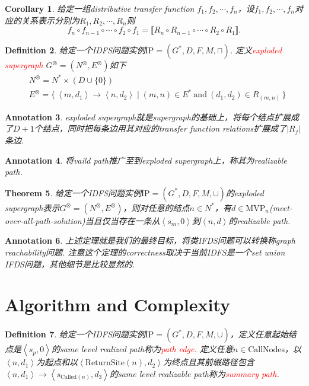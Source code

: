 \documentclass{article}
\newtheorem{theorem}{Theorem}[section]
\newtheorem{corollary}[theorem]{Corollary}
\newtheorem{definition}[theorem]{Definition}
\newtheorem{annotation}[theorem]{Annotation}
\newcommand\Set[2]{\{\,#1\mid#2\,\}} %
\newcommand{\redt}[1]{\textcolor{red}{#1}}
\begin{document}
\begin{corollary}
\rm 给定一组distributive transfer function $f_1,f_2,\cdots,f_n$，设$f_1,f_2,\cdots,f_n$对应的关系表示分别为$R_1,R_2,\cdots,R_n$则
$$
f_n \circ f_{n-1} \circ \cdots \circ f_2 \circ f_1 = \llbracket R_n \circ R_{n-1} \circ \cdots \circ R_2 \circ R_1 \rrbracket.
$$
\end{corollary}

\begin{definition}
\rm 给定一个IDFS问题实例$\text{IP}=(G^*,D,F,M,\sqcap)$. 定义\redt{exploded supergraph} $G^\otimes = (N^\otimes,E^\otimes)$如下
$$
\begin{aligned}
&N^\otimes = N^* \times (D \cup \{0\}) \\
&E^\otimes = \Set{\left<m,d_1\right> \to \left<n,d_2\right>}{(m,n) \in E^*~\text{and}~ (d_1,d_2) \in R_{(m,n)}}
\end{aligned} 
$$
\end{definition}

\begin{annotation}
\rm exploded supergraph就是supergraph的基础上，将每个结点扩展成了$D+1$个结点，同时把每条边用其对应的transfer function relations扩展成了$|R_f|$条边. 
\end{annotation}

\begin{annotation}
\rm 将vaild path推广至到exploded supergraph上，称其为realizable path.
\end{annotation}

\begin{theorem}
\rm 给定一个IDFS问题实例$\text{IP}=(G^*,D,F,M,\cup)$的exploded supergraph表示$G^\otimes = (N^\otimes,E^\otimes)$，则对任意的结点$n \in N^*$，有$d \in \text{MVP}_n$(meet-over-all-path-solution)当且仅当存在一条从$\left<s_m, 0\right>$到$\left<n,d\right>$的realizable path. 
\end{theorem}

\begin{annotation}
\rm 上述定理就是我们的最终目标，将类IFDS问题可以转换称graph reachability问题. 注意这个定理的correctness取决于当前IDFS是一个set union IFDS问题，其他细节是比较显然的. 
\end{annotation}

\newpage
\section{Algorithm and Complexity}


\begin{definition}
\rm 给定一个IDFS问题实例$\text{IP}=(G^*,D,F,M,\cup)$，定义任意起始结点是$\left<s_p,0\right>$的same level realized path称为\redt{path edge}. 定义任意$n \in \text{CallNodes}$，以$\left<n,d_1\right>$为起点和以$\left<\text{ReturnSite}(n),d_2\right>$为终点且其前缀路径包含$\left<n,d_1\right> \to \left<s_{\text{Called}(n)},d_3\right>$的same level realizable path称为\redt{summary path}. 
\end{definition}
\end{document}
